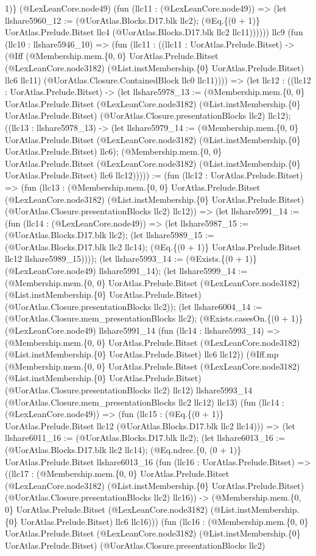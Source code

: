 \documentclass[11pt]{article}
\begin{document}
1)\} (@LexLeanCore.node49) (fun (llc11 : (@LexLeanCore.node49)) => (let llshare5960\_12 := (@UorAtlas.Blocks.D17.blk llc2); (@Eq.\{(0 + 1)\} UorAtlas.Prelude.Bitset llc4 (@UorAtlas.Blocks.D17.blk llc2 llc11)))))) llc9 (fun (llc10 : llshare5946\_10) => (fun (llc11 : ((llc11 : UorAtlas.Prelude.Bitset) -> (@Iff (@Membership.mem.\{0, 0\} UorAtlas.Prelude.Bitset (@LexLeanCore.node3182) (@List.instMembership.\{0\} UorAtlas.Prelude.Bitset) llc6 llc11) (@UorAtlas.Closure.ContainedBlock llc0 llc11)))) => (let llc12 : ((llc12 : UorAtlas.Prelude.Bitset) -> (let llshare5978\_13 := (@Membership.mem.\{0, 0\} UorAtlas.Prelude.Bitset (@LexLeanCore.node3182) (@List.instMembership.\{0\} UorAtlas.Prelude.Bitset) (@UorAtlas.Closure.presentationBlocks llc2) llc12); ((llc13 : llshare5978\_13) -> (let llshare5979\_14 := (@Membership.mem.\{0, 0\} UorAtlas.Prelude.Bitset (@LexLeanCore.node3182) (@List.instMembership.\{0\} UorAtlas.Prelude.Bitset) llc6); (@Membership.mem.\{0, 0\} UorAtlas.Prelude.Bitset (@LexLeanCore.node3182) (@List.instMembership.\{0\} UorAtlas.Prelude.Bitset) llc6 llc12))))) := (fun (llc12 : UorAtlas.Prelude.Bitset) => (fun (llc13 : (@Membership.mem.\{0, 0\} UorAtlas.Prelude.Bitset (@LexLeanCore.node3182) (@List.instMembership.\{0\} UorAtlas.Prelude.Bitset) (@UorAtlas.Closure.presentationBlocks llc2) llc12)) => (let llshare5991\_14 := (fun (llc14 : (@LexLeanCore.node49)) => (let llshare5987\_15 := (@UorAtlas.Blocks.D17.blk llc2); (let llshare5989\_15 := (@UorAtlas.Blocks.D17.blk llc2 llc14); (@Eq.\{(0 + 1)\} UorAtlas.Prelude.Bitset llc12 llshare5989\_15)))); (let llshare5993\_14 := (@Exists.\{(0 + 1)\} (@LexLeanCore.node49) llshare5991\_14); (let llshare5999\_14 := (@Membership.mem.\{0, 0\} UorAtlas.Prelude.Bitset (@LexLeanCore.node3182) (@List.instMembership.\{0\} UorAtlas.Prelude.Bitset) (@UorAtlas.Closure.presentationBlocks llc2)); (let llshare6004\_14 := (@UorAtlas.Closure.mem\_presentationBlocks llc2); (@Exists.casesOn.\{(0 + 1)\} (@LexLeanCore.node49) llshare5991\_14 (fun (llc14 : llshare5993\_14) => (@Membership.mem.\{0, 0\} UorAtlas.Prelude.Bitset (@LexLeanCore.node3182) (@List.instMembership.\{0\} UorAtlas.Prelude.Bitset) llc6 llc12)) (@Iff.mp (@Membership.mem.\{0, 0\} UorAtlas.Prelude.Bitset (@LexLeanCore.node3182) (@List.instMembership.\{0\} UorAtlas.Prelude.Bitset) (@UorAtlas.Closure.presentationBlocks llc2) llc12) llshare5993\_14 (@UorAtlas.Closure.mem\_presentationBlocks llc2 llc12) llc13) (fun (llc14 : (@LexLeanCore.node49)) => (fun (llc15 : (@Eq.\{(0 + 1)\} UorAtlas.Prelude.Bitset llc12 (@UorAtlas.Blocks.D17.blk llc2 llc14))) => (let llshare6011\_16 := (@UorAtlas.Blocks.D17.blk llc2); (let llshare6013\_16 := (@UorAtlas.Blocks.D17.blk llc2 llc14); (@Eq.ndrec.\{0, (0 + 1)\} UorAtlas.Prelude.Bitset llshare6013\_16 (fun (llc16 : UorAtlas.Prelude.Bitset) => ((llc17 : (@Membership.mem.\{0, 0\} UorAtlas.Prelude.Bitset (@LexLeanCore.node3182) (@List.instMembership.\{0\} UorAtlas.Prelude.Bitset) (@UorAtlas.Closure.presentationBlocks llc2) llc16)) -> (@Membership.mem.\{0, 0\} UorAtlas.Prelude.Bitset (@LexLeanCore.node3182) (@List.instMembership.\{0\} UorAtlas.Prelude.Bitset) llc6 llc16))) (fun (llc16 : (@Membership.mem.\{0, 0\} UorAtlas.Prelude.Bitset (@LexLeanCore.node3182) (@List.instMembership.\{0\} UorAtlas.Prelude.Bitset) (@UorAtlas.Closure.presentationBlocks llc2) 
\end{document}
